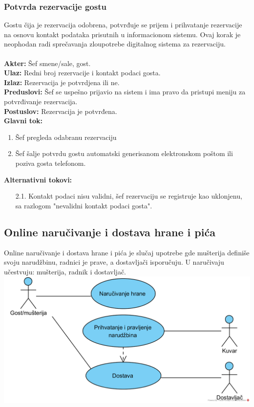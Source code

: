 \documentclass{article}
\begin{document}
\subsubsection{Potvrda rezervacije gostu}
Gostu čija je rezervacija odobrena, potvrđuje se prijem i prihvatanje rezervacije na osnovu kontakt podataka prisutnih u informacionom sistemu. Ovaj korak je neophodan radi sprečavanja zloupotrebe digitalnog sistema za rezervaciju.\\\\
\textbf{Akter:} Šef smene/sale, gost.\\
\textbf{Ulaz:} Redni broj rezervacije i kontakt podaci gosta.\\
\textbf{Izlaz:} Rezervacija je potvrdjena ili ne.\\
\textbf{Preduslovi:} Šef se uspešno prijavio na sistem i ima pravo da pristupi meniju za potvrđivanje rezervacija.\\
\textbf{Postuslov:} Rezervacija je potvrđena.\\
\textbf{Glavni tok:}
\begin{enumerate}
\item Šef pregleda odabranu rezervaciju
\item Šef šalje potvrdu gostu automatski generisanom elektronskom poštom ili poziva gosta telefonom.\\
\end{enumerate}
\textbf{Alternativni tokovi:}\\
\begin{itemize}
\item [2.1.] Kontakt podaci nisu validni, šef rezervaciju se  registruje kao uklonjenu, sa razlogom "nevalidni kontakt podaci gosta".
\end{itemize}
  

\subsection{Online naručivanje i dostava hrane i pića}
Online naručivanje i dostava hrane i pića je slučaj upotrebe gde mušterija definiše svoju narudžbinu, radnici je prave, a dostavljači isporučuju. U naručivaju učestvuju: mušterija, radnik i dostavljač.
\\
\includegraphics[width=\linewidth]{SU_6_dostava.png}
\end{document}
